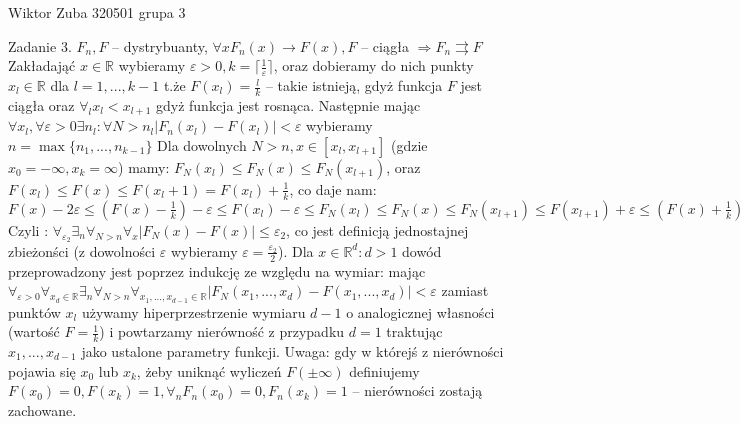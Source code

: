 \documentclass{article}
\begin{document}
Wiktor Zuba 320501 grupa 3
\newline

Zadanie 3.
\newline
$F_n,F$ -- dystrybuanty, $\forall x F_n(x)\rightarrow F(x), F$ -- ciągła $\Rightarrow F_n\rightrightarrows F$\newline
Zakładająć $x\in\mathbb{R}$ wybieramy $\varepsilon>0,k=\lceil\frac{1}{\varepsilon}\rceil$, oraz dobieramy do nich punkty $x_l\in\mathbb{R}$ dla $l=1,...,k-1$ t.że
$F(x_l)=\frac{l}{k}$ -- takie istnieją, gdyż funkcja $F$ jest ciągła oraz $\forall_l x_l<x_{l+1}$ gdyż funkcja jest rosnąca.\newline
Następnie mając $\forall x_l,\forall\varepsilon>0\exists n_l:\forall N>n_l |F_n(x_l)-F(x_l)|<\varepsilon$ wybieramy $n=\max\{n_1,...,n_{k-1}\}$\newline
Dla dowolnych $N>n,x\in[x_l,x_{l+1}]$ (gdzie $x_0=-\infty,x_k=\infty$) mamy: \newline
$F_N(x_l)\le F_N(x)\le F_N(x_{l+1})$, oraz $F(x_l)\le F(x)\le F(x_l+1)=F(x_l)+\frac{1}{k}$, co daje nam:\newline
$F(x)-2\varepsilon\le (F(x)-\frac{1}{k})-\varepsilon\le F(x_l)-\varepsilon\le F_N(x_l)\le F_N(x)\le F_N(x_{l+1})\le F(x_{l+1})+\varepsilon\le (F(x)+\frac{1}{k})+\varepsilon\le F(x)+2\varepsilon$\newline
Czyli : $\forall_{\varepsilon_2}\exists_n\forall_{N>n}\forall_x |F_N(x)-F(x)|\le\varepsilon_2$,
co jest definicją jednostajnej zbieżonści (z dowolności $\varepsilon$ wybieramy $\varepsilon=\frac{\varepsilon_2}{2}$).\newline\newline
Dla $x\in\mathbb{R}^d:d>1$ dowód przeprowadzony jest poprzez indukcję ze względu na wymiar:\newline
mając $\forall_{\varepsilon>0}\forall_{x_d\in\mathbb{R}}\exists_n\forall_{N>n}\forall_{x_1,...,x_{d-1}\in\mathbb{R}} |F_N(x_1,...,x_d)-F(x_1,...,x_d)|<\varepsilon$
zamiast punktów $x_l$ używamy hiperprzestrzenie wymiaru $d-1$ o analogicznej własności (wartość $F=\frac{1}{k}$)
i powtarzamy nierówność z przypadku $d=1$ traktując $x_1,...,x_{d-1}$ jako ustalone parametry funkcji.\newline\newline
Uwaga: gdy w którejś z nierówności pojawia się $x_0$ lub $x_k$, żeby uniknąć wyliczeń $F(\pm\infty)$ definiujemy $F(x_0)=0,F(x_k)=1,\forall_n F_n(x_0)=0,F_n(x_k)=1$
-- nierówności zostają zachowane.
\end{document}
